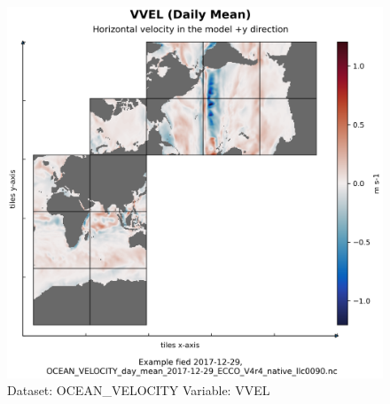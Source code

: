 \begin{longtable}{|m{}|m{}|m{}|m{}|}
\end{longtable}

\begin{figure}[H]
\centering
\includegraphics[scale=0.55]{../images/plots/native_plots/Ocean_Velocity/VVEL.png}
\caption{Dataset: OCEAN\_VELOCITY Variable: VVEL}
\label{tab:table-OCEAN_VELOCITY_VVEL-Plot}
\end{figure}
\pagebreak
